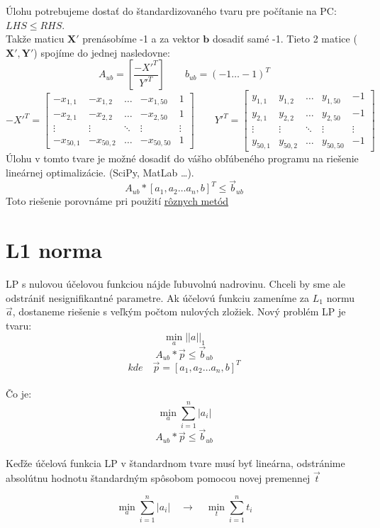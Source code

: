 \documentclass{article}
\begin{document}
Úlohu potrebujeme dostať do štandardizovaného tvaru pre počítanie na PC: $LHS \leq RHS$.\\
Takže maticu $\mathbf{X'}$ prenásobíme -1 a za vektor $\mathbf{b}$ dosadiť samé -1. Tieto 2 matice ($\mathbf{X', Y'}$) spojíme do jednej nasledovne:
\[A_{ub} = \left[\frac{-X'^T}{Y'^T}\right] \qquad b_{ub} = (-1 \ldots -1)^T\]
\[-X'^T = 
\begin{bmatrix}
-x_{1,1} & -x_{1,2} & \ldots &-x_{1,50} &1\\
-x_{2,1} & -x_{2,2} & \ldots &-x_{2,50} &1\\
\vdots&\vdots &  \ddots & \vdots &  \vdots \\
-x_{50,1} & -x_{50,2} & \ldots& -x_{50,50} &1 
\end{bmatrix}
\qquad
Y'^T=
\begin{bmatrix}
y_{1,1} & y_{1,2} & \ldots &y_{1,50} &-1\\
y_{2,1} & y_{2,2} & \ldots &y_{2,50} &-1\\
\vdots&\vdots &  \ddots & \vdots & \vdots\\
y_{50,1} & y_{50,2} & \ldots& y_{50,50} & -1
\end{bmatrix}
\]
Úlohu v tomto tvare je možné dosadiť do vášho obľúbeného programu na riešenie lineárnej optimalizácie. (SciPy, MatLab \ldots).
\[A_{ub} * [a_1,a_2 \ldots a_{n}, b]^T \leq \Vec{b}_{ub}\]
Toto riešenie porovnáme pri použití  \href{https://github.com/adam-213/LinPro2021/blob/main/Results/ZeroObjectiveFunc.txt}{rôznych metód}


\section{L1 norma}

LP s nulovou účelovou funkciou nájde ľubuvolnú nadrovinu. Chceli by sme ale odstrániť nesignifikantné parametre. Ak účelovú funkciu zameníme za $L_1$ normu $\Vec{a}$, dostaneme riešenie s veľkým počtom nulových zložiek. Nový problém LP je tvaru:
\\
\[\min_a ||a||_1\]
\[A_{ub} * \Vec{p} \leq \Vec{b}_{ub}\]
\[kde \quad \Vec{p} = [a_1,a_2 \ldots a_{n}, b]^T\]
\\
Čo je:
\\
\[\min_a \sum_{i=1}^{n}{|a_i|}\]
\[A_{ub} * \Vec{p} \leq \Vec{b}_{ub}\]
\\
Keďže účelová funkcia LP v štandardnom tvare musí byť lineárna, odstránime absolútnu hodnotu štandardným spôsobom pomocou novej premennej $\Vec{t}$

 \[\min_a \sum_{i=1}^{n}{|a_i|} \quad \xrightarrow[]{} \quad \min_t \sum_{i=1}^{n}{t_i}\]
\end{document}
